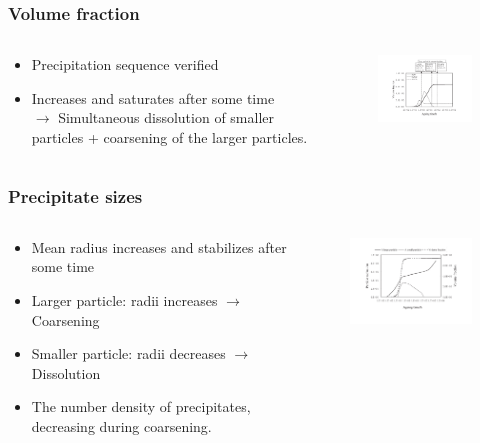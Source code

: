 \documentclass{beamer}
\begin{document}
\begin{frame}
\frametitle{Volume fraction}
\begin{columns}
\begin{column}{0.5\textwidth}
\begin{itemize}
\item Precipitation sequence verified
\item Increases and saturates after some time \\ $\rightarrow$ Simultaneous dissolution of smaller particles + coarsening of the larger particles.
\end{itemize}
\end{column}
\begin{column}{0.5\textwidth}
\begin{figure}
\centering
\includegraphics[width=6cm]{vol.pdf}
\label{fig:vol}
\end{figure}
\end{column}
\end{columns}
\end{frame}
\begin{frame}
\frametitle{Precipitate sizes}
\begin{columns}
\begin{column}{0.5\textwidth}
\begin{itemize}
\item Mean radius increases and stabilizes after some time 
\item Larger particle: radii increases $\rightarrow$ Coarsening
\item Smaller particle: radii decreases $\rightarrow$ Dissolution
\item The number density of precipitates, decreasing during coarsening.
\end{itemize}
\end{column}
\begin{column}{0.5\textwidth}
\begin{figure}
\centering
\includegraphics[width=6cm]{size.pdf}
\label{fig:size}
\end{figure}
\end{column}
\end{columns}
\end{frame}
\end{document}
